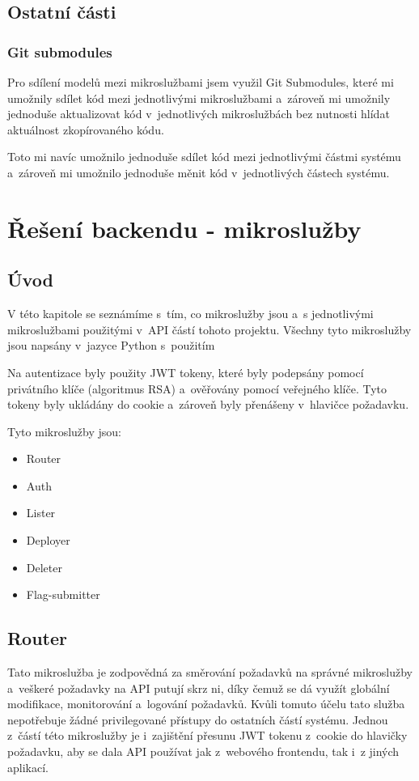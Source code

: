 \documentclass[12pt, a4paper,
oneside,      %
openright
]{report}
\begin{document}
\section{Ostatní části}
\subsection{Git submodules}
Pro sdílení modelů mezi mikroslužbami jsem využil Git Submodules, které mi umožnily sdílet kód mezi jednotlivými mikroslužbami a~zároveň mi umožnily jednoduše aktualizovat kód v~jednotlivých mikroslužbách bez nutnosti hlídat aktuálnost zkopírovaného kódu.

Toto mi navíc umožnilo jednoduše sdílet kód mezi jednotlivými částmi systému a~zároveň mi umožnilo jednoduše měnit kód v~jednotlivých částech systému.


\chapter{Řešení backendu - mikroslužby}

\section{Úvod}
\label{sec:uvod}

V této kapitole se seznámíme s~tím, co mikroslužby jsou a~s jednotlivými mikroslužbami použitými v~API částí tohoto projektu. Všechny tyto mikroslužby jsou napsány v~jazyce Python s~použitím 

Na autentizace byly použity JWT tokeny, které byly podepsány pomocí privátního klíče (algoritmus RSA) a~ověřovány pomocí veřejného klíče. Tyto tokeny byly ukládány do cookie a~zároveň byly přenášeny v~hlavičce požadavku.

Tyto mikroslužby jsou:
\begin{itemize}
	\item Router
	\item Auth
	\item Lister
	\item Deployer 
	\item Deleter
	\item Flag-submitter
\end{itemize}

\section{Router}
Tato mikroslužba je zodpovědná za směrování požadavků na správné mikroslužby a~veškeré požadavky na API putují skrz ni, díky čemuž se dá využít globální modifikace, monitorování a~logování požadavků. Kvůli tomuto účelu tato služba nepotřebuje žádné privilegované přístupy do ostatních částí systému. Jednou z~částí této mikroslužby je i~zajištění přesunu JWT tokenu z~cookie do hlavičky požadavku, aby se dala API používat jak z~webového frontendu, tak i~z jiných aplikací.
\end{document}
